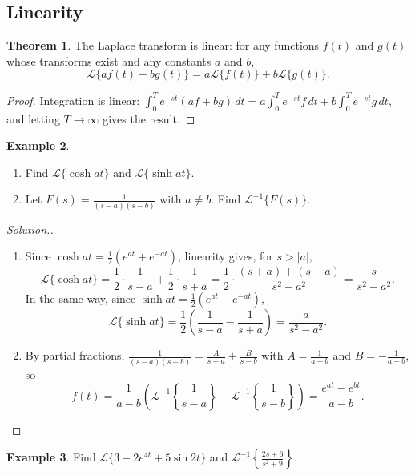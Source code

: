 \documentclass[11pt,a4paper]{article}
\theoremstyle{definition}
\newtheorem{thm}{Theorem}[subsection]
\newtheorem{exa}[thm]{Example}
\newenvironment{solution}
  {\renewcommand{\qedsymbol}{}\begin{proof}[\textit{Solution}.]}
  {\end{proof}}
\begin{document}
{\color[wave]{485}\subsection{Linearity}}

\begin{thm}
\label{thm:linearity}
The Laplace transform is linear: for any functions $f(t)$ and $g(t)$ whose
transforms exist and any constants $a$ and $b$,
\[\mathcal{L}\{a f(t) + b g(t)\} = a\mathcal{L}\{f(t)\} + b\mathcal{L}\{g(t)\} .\]
\end{thm}

\begin{proof}
Integration is linear:
$\int_0^T e^{-st}(af + bg)\,dt = a\int_0^Te^{-st}f\,dt + b\int_0^Te^{-st}g\,dt$,
and letting $T\to\infty$ gives the result.
\end{proof}

\begin{exa}
\label{ex:coshinverse}
\begin{enumerate}
\item Find $\mathcal{L}\{\cosh at\}$ and $\mathcal{L}\{\sinh at\}$.
\item Let $F(s) = \frac{1}{(s-a)(s-b)}$ with $a\neq b$. Find
$\mathcal{L}^{-1}\{F(s)\}$.
\end{enumerate}
\end{exa}

\begin{solution}
\begin{enumerate}
\item Since $\cosh at = \frac12(e^{at} + e^{-at})$, linearity gives, for $s>|a|$,
\[\mathcal{L}\{\cosh at\} = \frac{1}{2}\cdot\frac{1}{s - a} + \frac{1}{2}\cdot
\frac{1}{s + a} = \frac{1}{2}\cdot\frac{(s + a) + (s - a)}{s^2 - a^2} =
\frac{s}{s^2 - a^2} .\]
In the same way, since $\sinh at = \frac12(e^{at} - e^{-at})$,
\[\mathcal{L}\{\sinh at\} = \frac{1}{2}\left(\frac{1}{s - a} - \frac{1}{s +
a}\right) = \frac{a}{s^2 - a^2} .\]

\item By partial fractions,
$\frac{1}{(s -a)(s-b)} = \frac{A}{s -a} + \frac{B}{s -b}$ with
$A = \frac{1}{a - b}$ and $B = -\frac{1}{a - b}$, so
\[f(t) = \frac{1}{a-b}\left(\mathcal{L}^{-1}\left\{\frac{1}{s - a}\right\} -
\mathcal{L}^{-1}\left\{\frac{1}{s-b}\right\}\right) = \frac{e^{at} - e^{bt}}{a -
b} .\]
\end{enumerate}
\end{solution}

\begin{exa}
\label{ex:linearcombo}
Find $\mathcal{L}\{3 - 2e^{4t} + 5\sin 2t\}$ and $\mathcal{L}^{-1}\left\{\frac{2s
+ 6}{s^2 + 9}\right\}$.
\end{exa}
\end{document}
